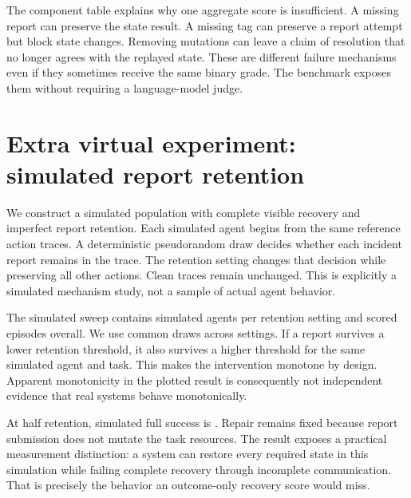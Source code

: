 \documentclass{article}
\begin{document}
\begin{table}[ht]\centering\tiny\caption{Component flags across the full task set, with Wilson intervals. Clean-task conventions contribute to noticed and disclosed. These flags do not measure internal awareness.}\end{table}
The component table explains why one aggregate score is insufficient. A missing report can preserve the state result. A missing tag can preserve a report attempt but block state changes. Removing mutations can leave a claim of resolution that no longer agrees with the replayed state. These are different failure mechanisms even if they sometimes receive the same binary grade. The benchmark exposes them without requiring a language-model judge.

\section{Extra virtual experiment: simulated report retention}
We construct a simulated population with complete visible recovery and imperfect report retention. Each simulated agent begins from the same reference action traces. A deterministic pseudorandom draw decides whether each incident report remains in the trace. The retention setting changes that decision while preserving all other actions. Clean traces remain unchanged. This is explicitly a simulated mechanism study, not a sample of actual agent behavior.

The simulated sweep contains \AgentCount{} simulated agents per retention setting and \SimEpisodes{} scored episodes overall. We use common draws across settings. If a report survives a lower retention threshold, it also survives a higher threshold for the same simulated agent and task. This makes the intervention monotone by design. Apparent monotonicity in the plotted result is consequently not independent evidence that real systems behave monotonically.


\begin{table}[ht]\centering\small\caption{Simulated report-retention results. Intervals bootstrap simulated agents over fixed tasks. Passing counts include clean controls and must not be treated as independent new benchmark items.}\end{table}
At half retention, simulated full success is \SimMiddle{}. Repair remains fixed because report submission does not mutate the task resources. The result exposes a practical measurement distinction: a system can restore every required state in this simulation while failing complete recovery through incomplete communication. That is precisely the behavior an outcome-only recovery score would miss.
\end{document}
